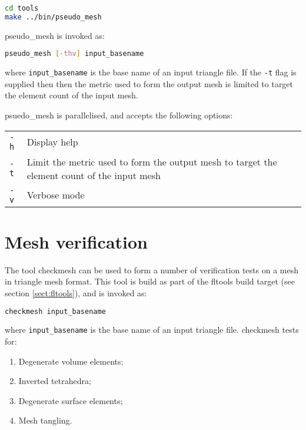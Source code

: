 \begin{lstlisting}[language = Bash]
cd tools
make ../bin/pseudo_mesh
\end{lstlisting}

pseudo\_mesh is invoked as:

\begin{lstlisting}[language = Bash]
pseudo_mesh [-thv] input_basename
\end{lstlisting}

where \lstinline[language = Bash]*input_basename* is the base name of an input
triangle file. If the \lstinline[language = Bash]*-t* flag is supplied then
then the metric used to form the output mesh is limited to target the element
count of the input mesh.

psuedo\_mesh is parallelised, and accepts the following options:

\begin{center}
  \begin{tabular}{lp{}}
    \hline
    \lstinline+-h+   & Display help \\
    \lstinline+-t+   & Limit the metric used to form the output mesh to
    target the element count of the input mesh \\
    \lstinline+-v+   & Verbose mode \\
    \hline
  \end{tabular}
\end{center}

\section{Mesh verification}

The tool checkmesh can be used to form a number of verification tests on a mesh
in triangle mesh format. This tool is build as part of the fltools build target
(see section \ref{sect:fltools}), and is invoked as:

\begin{lstlisting}[language = Bash]
checkmesh input_basename
\end{lstlisting}

where \lstinline[language = Bash]*input_basename* is the base name of an input
triangle file. checkmesh tests for:

\begin{enumerate}
  \item Degenerate volume elements;
  \item Inverted tetrahedra;
  \item Degenerate surface elements;
  \item\label{item:mesh_tangling} Mesh tangling.
\end{enumerate}

